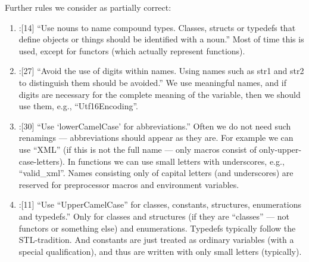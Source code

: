 \documentclass{book}
\begin{document}
Further rules we consider as partially correct:
\begin{enumerate}
\item \cite{OKL_MisfeldtBumgardnerGray2004CppStyle}:[14] ``Use nouns to name compound types. Classes, structs or typedefs that define objects or things should be identified with a noun.'' Most of time this is used, except for functors (which actually represent functions).
\item \cite{OKL_MisfeldtBumgardnerGray2004CppStyle}:[27] ``Avoid the use of digits within names. Using names such as str1 and str2 to distinguish them should be avoided.'' We use meaningful names, and if digits are necessary for the complete meaning of the variable, then we should use them, e.g., ``Utf16Encoding''.
\item \cite{OKL_MisfeldtBumgardnerGray2004CppStyle}:[30] ``Use `lowerCamelCase' for abbreviations.'' Often we do not need such renamings --- abbreviations should appear as they are. For example we can use ``XML'' (if this is not the full name --- only macros consist of only-upper-case-letters). In functions we can use small letters with underscores, e.g., ``valid\_xml''. Names consisting only of capital letters (and underscores) are reserved for preprocessor macros and environment variables.
\item \cite{OKL_MisfeldtBumgardnerGray2004CppStyle}:[11] ``Use ``UpperCamelCase'' for classes, constants, structures, enumerations and typedefs.'' Only for classes and structures (if they are ``classes'' --- not functors or something else) and enumerations. Typedefs typically follow the STL-tradition. And constants are just treated as ordinary variables (with a special qualification), and thus are written with only small letters (typically).
\end{enumerate}
\end{document}
